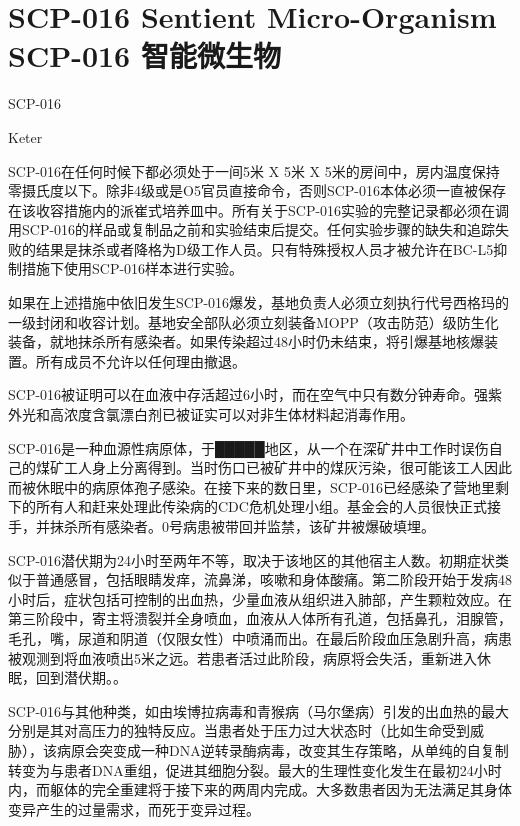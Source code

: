 \chapter[SCP-016 智能微生物]{
    SCP-016 Sentient Micro-Organism\\
    SCP-016 智能微生物
}

\label{chap:SCP-016}

SCP-016

Keter

SCP-016在任何时候下都必须处于一间5米 X 5米 X 5米的房间中，房内温度保持零摄氏度以下。除非4级或是O5官员直接命令，否则SCP-016本体必须一直被保存在该收容措施内的派崔式培养皿中。所有关于SCP-016实验的完整记录都必须在调用SCP-016的样品或复制品之前和实验结束后提交。任何实验步骤的缺失和追踪失败的结果是抹杀或者降格为D级工作人员。只有特殊授权人员才被允许在BC-L5抑制措施下使用SCP-016样本进行实验。

如果在上述措施中依旧发生SCP-016爆发，基地负责人必须立刻执行代号西格玛的一级封闭和收容计划。基地安全部队必须立刻装备MOPP（攻击防范）级防生化装备，就地抹杀所有感染者。如果传染超过48小时仍未结束，将引爆基地核爆装置。所有成员不允许以任何理由撤退。

SCP-016被证明可以在血液中存活超过6小时，而在空气中只有数分钟寿命。强紫外光和高浓度含氯漂白剂已被证实可以对非生体材料起消毒作用。

SCP-016是一种血源性病原体，于█████地区，从一个在深矿井中工作时误伤自己的煤矿工人身上分离得到。当时伤口已被矿井中的煤灰污染，很可能该工人因此而被休眠中的病原体孢子感染。在接下来的数日里，SCP-016已经感染了营地里剩下的所有人和赶来处理此传染病的CDC危机处理小组。基金会的人员很快正式接手，并抹杀所有感染者。0号病患被带回并监禁，该矿井被爆破填埋。

SCP-016潜伏期为24小时至两年不等，取决于该地区的其他宿主人数。初期症状类似于普通感冒，包括眼睛发痒，流鼻涕，咳嗽和身体酸痛。第二阶段开始于发病48小时后，症状包括可控制的出血热，少量血液从组织进入肺部，产生颗粒效应。在第三阶段中，寄主将溃裂并全身喷血，血液从人体所有孔道，包括鼻孔，泪腺管，毛孔，嘴，尿道和阴道（仅限女性）中喷涌而出。在最后阶段血压急剧升高，病患被观测到将血液喷出5米之远。若患者活过此阶段，病原将会失活，重新进入休眠，回到潜伏期。。

SCP-016与其他种类，如由埃博拉病毒和青猴病（马尔堡病）引发的出血热的最大分别是其对高压力的独特反应。当患者处于压力过大状态时（比如生命受到威胁），该病原会突变成一种DNA逆转录酶病毒，改变其生存策略，从单纯的自复制转变为与患者DNA重组，促进其细胞分裂。最大的生理性变化发生在最初24小时内，而躯体的完全重建将于接下来的两周内完成。大多数患者因为无法满足其身体变异产生的过量需求，而死于变异过程。

